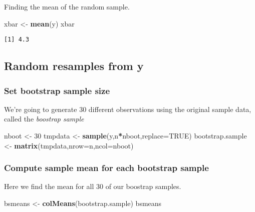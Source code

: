 \documentclass[]{book}
\newenvironment{Shaded}{\begin{snugshade}}{\end{snugshade}}
\newcommand{\KeywordTok}[1]{\textcolor[rgb]{0.13,0.29,0.53}{\textbf{#1}}}
\newcommand{\DataTypeTok}[1]{\textcolor[rgb]{0.13,0.29,0.53}{#1}}
\newcommand{\DecValTok}[1]{\textcolor[rgb]{0.00,0.00,0.81}{#1}}
\newcommand{\StringTok}[1]{\textcolor[rgb]{0.31,0.60,0.02}{#1}}
\newcommand{\OtherTok}[1]{\textcolor[rgb]{0.56,0.35,0.01}{#1}}
\newcommand{\OperatorTok}[1]{\textcolor[rgb]{0.81,0.36,0.00}{\textbf{#1}}}
\newcommand{\NormalTok}[1]{#1}
\theoremstyle{definition}
\theoremstyle{definition}
\theoremstyle{definition}
\theoremstyle{remark}
\begin{document}
Finding the mean of the random sample.

\begin{Shaded}
\begin{Highlighting}[]
\NormalTok{xbar <-}\StringTok{ }\KeywordTok{mean}\NormalTok{(y)}
\NormalTok{xbar}
\end{Highlighting}
\end{Shaded}

\begin{verbatim}
[1] 4.3
\end{verbatim}

\subsection{Random resamples from y}\label{random-resamples-from-y}

\subsubsection{Set bootstrap sample
size}\label{set-bootstrap-sample-size}

We're going to generate 30 different observations using the original
sample data, called the \emph{boostrap sample}

\begin{Shaded}
\begin{Highlighting}[]
\NormalTok{nboot <-}\StringTok{ }\DecValTok{30}
\NormalTok{tmpdata <-}\StringTok{ }\KeywordTok{sample}\NormalTok{(y,n}\OperatorTok{*}\NormalTok{nboot,}\DataTypeTok{replace=}\OtherTok{TRUE}\NormalTok{)}
\NormalTok{bootstrap.sample <-}\StringTok{ }\KeywordTok{matrix}\NormalTok{(tmpdata,}\DataTypeTok{nrow=}\NormalTok{n,}\DataTypeTok{ncol=}\NormalTok{nboot)}
\end{Highlighting}
\end{Shaded}

\subsubsection{Compute sample mean for each bootstrap
sample}\label{compute-sample-mean-for-each-bootstrap-sample}

Here we find the mean for all 30 of our boostrap samples.

\begin{Shaded}
\begin{Highlighting}[]
\NormalTok{bsmeans <-}\StringTok{ }\KeywordTok{colMeans}\NormalTok{(bootstrap.sample)}
\NormalTok{bsmeans}
\end{Highlighting}
\end{Shaded}
\end{document}
